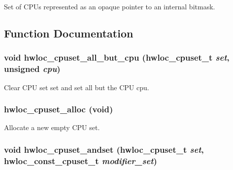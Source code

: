 Set of CPUs represented as an opaque pointer to an internal bitmask. 

\subsection{Function Documentation}
\hypertarget{group__hwlocality__cpuset_gaddd96b6d8b7d11e0891c7416e5a68598}{
\subsubsection[{hwloc\_\-cpuset\_\-all\_\-but\_\-cpu}]{\setlength{\rightskip}{0pt plus 5cm}void hwloc\_\-cpuset\_\-all\_\-but\_\-cpu ({\bf hwloc\_\-cpuset\_\-t} {\em set}, \/  unsigned {\em cpu})}}
\label{group__hwlocality__cpuset_gaddd96b6d8b7d11e0891c7416e5a68598}


Clear CPU set {\ttfamily set} and set all but the CPU {\ttfamily cpu}. \hypertarget{group__hwlocality__cpuset_ga82803256c7e78369aad77a2a9e5599a2}{
\subsubsection[{hwloc\_\-cpuset\_\-alloc}]{ hwloc\_\-cpuset\_\-alloc (void)}}
\label{group__hwlocality__cpuset_ga82803256c7e78369aad77a2a9e5599a2}


Allocate a new empty CPU set. \hypertarget{group__hwlocality__cpuset_ga79ccfa8ee2a2f76be5076297ba7e4182}{
\subsubsection[{hwloc\_\-cpuset\_\-andset}]{\setlength{\rightskip}{0pt plus 5cm}void hwloc\_\-cpuset\_\-andset ({\bf hwloc\_\-cpuset\_\-t} {\em set}, \/  {\bf hwloc\_\-const\_\-cpuset\_\-t} {\em modifier\_\-set})}}
\label{group__hwlocality__cpuset_ga79ccfa8ee2a2f76be5076297ba7e4182}


